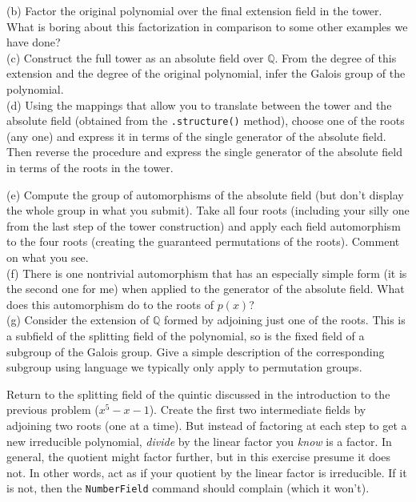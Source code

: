 %
(b) Factor the original polynomial over the final extension field in the tower.  What is boring about this factorization in comparison to some other examples we have done?\\
%
(c) Construct the full tower as an absolute field over ${\mathbb Q}$.  From the degree of this extension and the degree of the original polynomial, infer the Galois group of the polynomial.\\
%
(d) Using the mappings that allow you to translate between the tower and the absolute field (obtained from the \verb?.structure()? method), choose one of the roots (any one) and express it in terms of the single generator of the absolute field.  Then reverse the procedure and express the single generator of the absolute field in terms of the roots in the tower.\par
%
(e) Compute the group of automorphisms of the absolute field (but don't display the whole group in what you submit).  Take all four roots (including your silly one from the last step of the tower construction) and apply each field automorphism to the four roots (creating the guaranteed permutations of the roots).  Comment on what you see.\\
%
(f)  There is one nontrivial automorphism that has an especially simple form (it is the second one for me) when applied to the generator of the absolute field.  What does this automorphism do to the roots of $p(x)$?\\
%
(g)  Consider the extension of ${\mathbb Q}$ formed by adjoining just one of the roots.  This is a subfield of the splitting field of the polynomial, so is the fixed field of a subgroup of the Galois group.  Give a simple description of the corresponding subgroup using language we typically only apply to permutation groups.
\begin{sageverbatim}\end{sageverbatim}
%
%
Return to the splitting field of the quintic discussed in the introduction to the previous problem ($x^5-x-1$).  Create the first two intermediate fields by adjoining two roots (one at a time).  But instead of factoring at each step to get a new irreducible polynomial, \emph{divide} by the linear factor you \emph{know} is a factor.  In general, the quotient might factor further, but in this exercise presume it does not.  In other words, act as if your quotient by the linear factor is irreducible.  If it is not, then the \texttt{NumberField} command should complain (which it won't).\par
